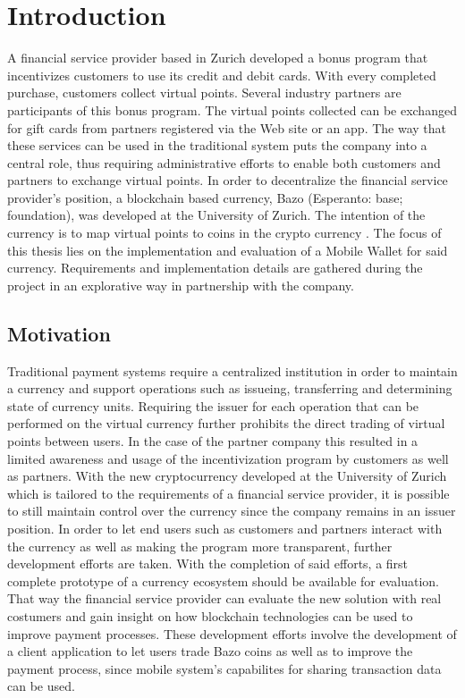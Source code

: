 \chapter{Introduction}

A financial service provider based in Zurich developed a bonus program that incentivizes customers to use its credit and debit cards. With every completed purchase, customers collect virtual points. Several industry partners are participants of this bonus program. The virtual points collected can be exchanged for gift cards from partners registered via the Web site or an app. The way that these services can be used in the traditional system puts the company into a central role, thus requiring administrative efforts to enable both customers and partners to exchange virtual points. In order to decentralize the financial service provider's position, a blockchain based currency, Bazo (Esperanto: base; foundation), was developed at the University of Zurich. The intention of the currency is to map virtual points to coins in the crypto currency \cite{lisg}.
The focus of this thesis lies on the implementation and evaluation of a Mobile Wallet for said currency. Requirements and implementation details are gathered during the project in an explorative way in partnership with the company.
\section{Motivation}
Traditional payment systems require a centralized institution in order to maintain a currency and support operations such as issueing, transferring and determining state of currency units. Requiring the issuer for each operation that can be performed on the virtual currency further prohibits the direct trading of virtual points between users.
In the case of the partner company this resulted in a limited awareness and usage of the incentivization program by customers as well as partners.
With the new cryptocurrency developed at the University of Zurich which is tailored to the requirements of a financial service provider, it is possible to still maintain control over the currency since the company remains in an issuer position. In order to let end users such as customers and partners interact with the currency as well as making the program more transparent, further development efforts are taken. With the completion of said efforts, a first complete prototype of a currency ecosystem should be available for evaluation. That way the financial service provider can evaluate the new solution with real costumers and gain insight on how blockchain technologies can be used to improve payment processes. These development efforts involve the development of a client application to let users trade Bazo coins as well as to improve the payment process, since mobile system's capabilites for sharing transaction data can be used.

